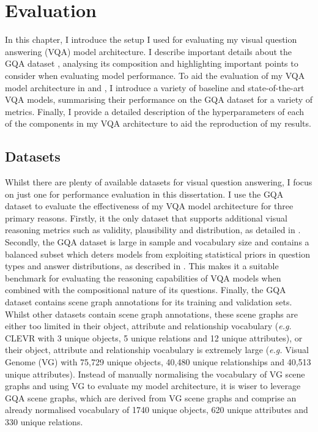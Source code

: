 \chapter{Evaluation}
\label{chapter:evaluation}

In this chapter, I introduce the setup I used for evaluating my visual question answering (VQA) model architecture. I describe important details about the GQA dataset \cite{hudson2019gqa}, analysing its composition and highlighting important points to consider when evaluating model performance. To aid the evaluation of my VQA model architecture in \chapterautorefname{ \ref{chapter:results}} and \chapterautorefname{ \ref{chapter:discussion}}, I introduce a variety of baseline and state-of-the-art VQA models, summarising their performance on the GQA dataset for a variety of metrics. Finally, I provide a detailed description of the hyperparameters of each of the components in my VQA architecture to aid the reproduction of my results.

\section{Datasets}

Whilst there are plenty of available datasets for visual question answering, I focus on just one for performance evaluation in this dissertation. I use the GQA dataset to evaluate the effectiveness of my VQA model architecture for three primary reasons. Firstly, it the only dataset that supports additional visual reasoning metrics such as validity, plausibility and distribution, as detailed in \subsectionautorefname{ \ref{subsec:visual_reasoning_metrics}}. Secondly, the GQA dataset is large in sample and vocabulary size and contains a balanced subset which deters models from exploiting statistical priors in question types and answer distributions, as described in \subsectionautorefname{ \ref{subsec:lanauge_priors_in_vqa_datasets}}. This makes it a suitable benchmark for evaluating the reasoning capabilities of VQA models when combined with the compositional nature of its questions. Finally, the GQA dataset contains scene graph annotations for its training and validation sets. Whilst other datasets contain scene graph annotations, these scene graphs are either too limited in their object, attribute and relationship vocabulary (\textit{e.g.} CLEVR \cite{johnson2017clevr} with 3 unique objects, 5 unique relations and 12 unique attributes), or their object, attribute and relationship vocabulary is extremely large (\textit{e.g.} Visual Genome (VG) \cite{krishna2017visual} with 75,729 unique objects, 40,480 unique relationships and 40,513 unique attributes). Instead of manually normalising the vocabulary of VG scene graphs and using VG to evaluate my model architecture, it is wiser to leverage GQA scene graphs, which are derived from VG scene graphs and comprise an already normalised vocabulary of 
1740 unique objects, 620 unique attributes and 330 unique relations.

